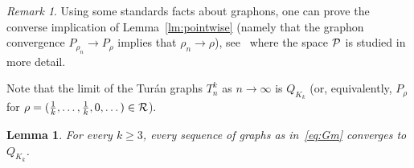 \documentclass[12pt]{article}
\newtheorem{lemma}[theorem]{Lemma}
\theoremstyle{definition}
\theoremstyle{remark}
\newtheorem{remark}{Remark}
\newcommand{\C}[1]{{\protect\mathcal{#1}}}
\renewcommand{\ge}{\geqslant}
\begin{document}
\begin{remark} Using some standards facts about graphons, one can prove the converse implication of Lemma~\ref{lm:pointwise} (namely that the graphon convergence $P_{\rho_{n}}\to P_\rho$ implies that $\rho_{n}\to\rho$), see~\cite{LiuPikhurkoSharifzadehStaden} where the space $\C P$ is studied in more detail.
\end{remark}	

Note that the limit of the Tur\'an graphs $T^k_n$ as $n\to\infty$ is $Q_{K_k}$ (or, equivalently, $P_\rho$ for $\rho=(\frac1k,\dots,\frac1k,0,\dots)\in\C{R}$).

\begin{lemma}\label{lm:Unique} For every $k\ge 3$, every sequence of graphs as in~\eqref{eq:Gm} converges to $Q_{K_k}$.
\end{lemma}
\end{document}
